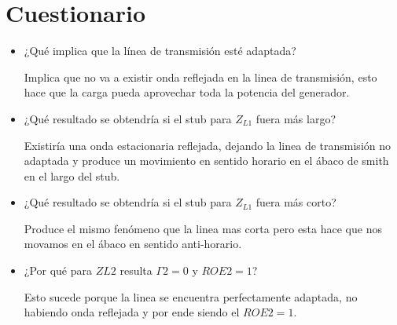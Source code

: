 \documentclass[12pt]{article}
\begin{document}
\section{Cuestionario}
\begin{itemize}

\item ¿Qué implica que la línea de transmisión esté adaptada?

Implica que no va a existir onda reflejada en la linea de transmisión, esto hace que la carga pueda aprovechar toda la potencia del generador.
\item ¿Qué resultado se obtendría si el stub para $Z_{L1}$  fuera más largo?

Existir\'ia una onda estacionaria reflejada, dejando la linea de transmisión no adaptada y produce un movimiento en sentido horario en el \'abaco de smith en el largo del stub.
\item ¿Qué resultado se obtendría si el stub para $Z_{L1}$  fuera más corto?

Produce el mismo fen\'omeno que la linea mas corta pero esta hace que nos movamos en el \'abaco en sentido anti-horario.
\item ¿Por qué para $ZL2$ resulta $\Gamma 2 = 0$ y $ROE2 = 1$?

Esto sucede porque la linea se encuentra perfectamente adaptada, no habiendo onda reflejada y por ende siendo el $ROE2 = 1$.
\end{itemize}
\end{document}
